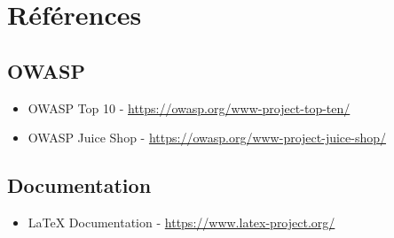 
\chapter{Références}

\section{OWASP}
\begin{itemize}
    \item OWASP Top 10 - \url{https://owasp.org/www-project-top-ten/}
    \item OWASP Juice Shop - \url{https://owasp.org/www-project-juice-shop/}
\end{itemize}

\section{Documentation}
\begin{itemize}
    \item LaTeX Documentation - \url{https://www.latex-project.org/}
\end{itemize}
